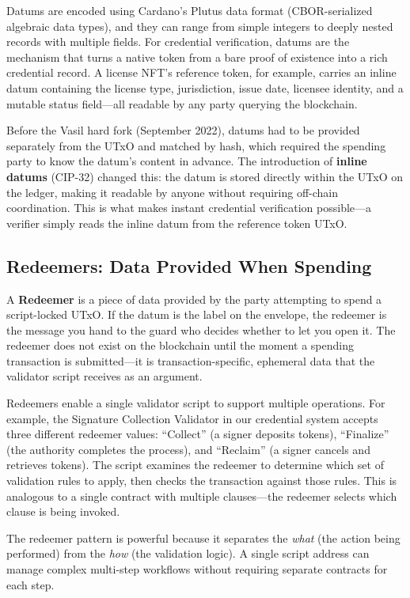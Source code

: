 Datums are encoded using Cardano's Plutus data format (CBOR-serialized
algebraic data types), and they can range from simple integers to deeply
nested records with multiple fields. For credential verification, datums
are the mechanism that turns a native token from a bare proof of
existence into a rich credential record. A license NFT's reference token,
for example, carries an inline datum containing the license type,
jurisdiction, issue date, licensee identity, and a mutable status
field---all readable by any party querying the blockchain.

Before the Vasil hard fork (September 2022), datums had to be provided
separately from the UTxO and matched by hash, which required the
spending party to know the datum's content in advance. The introduction
of \textbf{inline datums} (CIP-32) changed this: the datum is stored
directly within the UTxO on the ledger, making it readable by anyone
without requiring off-chain coordination. This is what makes instant
credential verification possible---a verifier simply reads the inline
datum from the reference token UTxO.

\subsection{Redeemers: Data Provided When Spending}

A \textbf{Redeemer} is a piece of data provided by the party attempting
to spend a script-locked UTxO. If the datum is the label on the
envelope, the redeemer is the message you hand to the guard who decides
whether to let you open it. The redeemer does not exist on the
blockchain until the moment a spending transaction is submitted---it is
transaction-specific, ephemeral data that the validator script receives
as an argument.

Redeemers enable a single validator script to support multiple
operations. For example, the Signature Collection Validator in our
credential system accepts three different redeemer values: ``Collect''
(a signer deposits tokens), ``Finalize'' (the authority completes the
process), and ``Reclaim'' (a signer cancels and retrieves tokens). The
script examines the redeemer to determine which set of validation rules
to apply, then checks the transaction against those rules. This is
analogous to a single contract with multiple clauses---the redeemer
selects which clause is being invoked.

The redeemer pattern is powerful because it separates the \emph{what}
(the action being performed) from the \emph{how} (the validation logic).
A single script address can manage complex multi-step workflows without
requiring separate contracts for each step.

